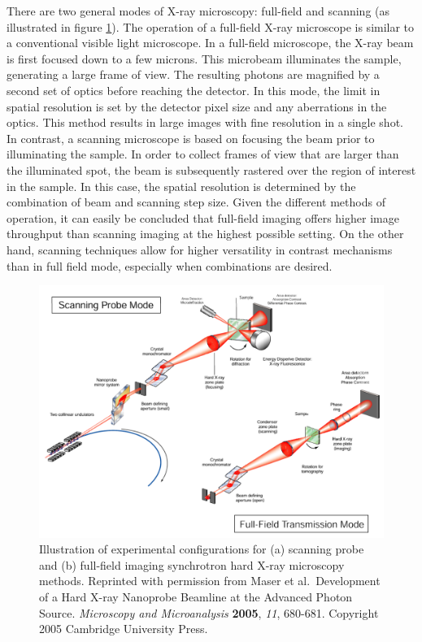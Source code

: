 \documentclass[journal=cmatex,manuscript=perspective]{achemso}
\begin{document}
There are two general modes of X-ray microscopy: full-field and
scanning (as illustrated in figure \ref{figure:maser2005}). The
operation of a full-field X-ray microscope is similar to a
conventional visible light microscope. In a full-field microscope, the
X-ray beam is first focused down to a few microns. This microbeam
illuminates the sample, generating a large frame of view. The
resulting photons are magnified by a second set of optics before
reaching the detector.  In this mode, the limit in spatial resolution
is set by the detector pixel size and any aberrations in the
optics. This method results in large images with fine resolution in a
single shot. In contrast, a scanning microscope is based on focusing
the beam prior to illuminating the sample.  In order to collect frames
of view that are larger than the illuminated spot, the beam is
subsequently rastered over the region of interest in the sample. In
this case, the spatial resolution is determined by the combination of
beam and scanning step size. Given the different methods of operation,
it can easily be concluded that full-field imaging offers higher image
throughput than scanning imaging at the highest possible setting. On
the other hand, scanning techniques allow for higher versatility in
contrast mechanisms than in full field mode, especially when
combinations are desired.

\begin{figure}
  \includegraphics[width=\textwidth]{maser2005.png}
  \caption{Illustration of experimental configurations for (a)
    scanning probe and (b) full-field imaging synchrotron hard X-ray
    microscopy methods. Reprinted with permission from Maser et
    al.\ Development of a Hard X-ray Nanoprobe Beamline at the Advanced
    Photon Source. \textit{Microscopy and Microanalysis}
    \textbf{2005}, \textit{11}, 680-681. Copyright 2005 Cambridge
    University Press.}
  \label{figure:maser2005}
\end{figure}
\end{document}
